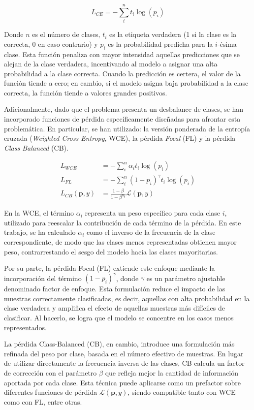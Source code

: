 \begin{equation}
L_{CE} = -\sum_i^n t_i \log(p_i)
\end{equation}

Donde $n$ es el número de clases, $t_i$ es la etiqueta verdadera (1 si la clase es la correcta, 0 en caso contrario) y $p_i$ es la probabilidad predicha para la $i$-ésima clase. Esta función penaliza con mayor intensidad aquellas predicciones que se alejan de la clase verdadera, incentivando al modelo a asignar una alta probabilidad a la clase correcta. Cuando la predicción es certera, el valor de la función tiende a cero; en cambio, si el modelo asigna baja probabilidad a la clase correcta, la función tiende a valores grandes positivos.

Adicionalmente, dado que el problema presenta un desbalance de clases, se han incorporado funciones de pérdida específicamente diseñadas para afrontar esta problemática. En particular, se han utilizado: la versión ponderada de la entropía cruzada (\textit{Weighted Cross Entropy}, WCE), la pérdida \textit{Focal} (FL) y la pérdida \textit{Class Balanced} (CB).

\begin{align}
    L_{WCE} &= -\sum_i^n \alpha_{i} t_i \log(p_i) \\
    L_{FL} &= -\sum_i^n (1-p_i)^{\gamma} t_i \log(p_i) \\
    L_{CB}(\textbf{p},y) &= \frac{1-\beta}{1-\beta^{n_{y}}} \mathcal{L}(\textbf{p},y)
\end{align}

En la WCE, el término $\alpha_i$ representa un peso específico para cada clase $i$, utilizado para reescalar la contribución de cada término de la pérdida. En este trabajo, se ha calculado $\alpha_i$ como el inverso de la frecuencia de la clase correspondiente, de modo que las clases menos representadas obtienen mayor peso, contrarrestando el sesgo del modelo hacia las clases mayoritarias.

Por su parte, la pérdida Focal (FL) extiende este enfoque mediante la incorporación del término $(1 - p_i)^\gamma$, donde $\gamma$ es un parámetro ajustable denominado factor de enfoque. Esta formulación reduce el impacto de las muestras correctamente clasificadas, es decir, aquellas con alta probabilidad en la clase verdadera y amplifica el efecto de aquellas muestras más difíciles de clasificar. Al hacerlo, se logra que el modelo se concentre en los casos menos representados.

La pérdida Class-Balanced (CB), en cambio, introduce una formulación más refinada del peso por clase, basada en el número efectivo de muestras. En lugar de utilizar directamente la frecuencia inversa de las clases, CB calcula un factor de corrección con el parámetro $\beta$ que refleja mejor la cantidad de información aportada por cada clase. Esta técnica puede aplicarse como un prefactor sobre diferentes funciones de pérdida $\mathcal{L}(\mathbf{p}, y)$, siendo compatible tanto con WCE como con FL, entre otras.

